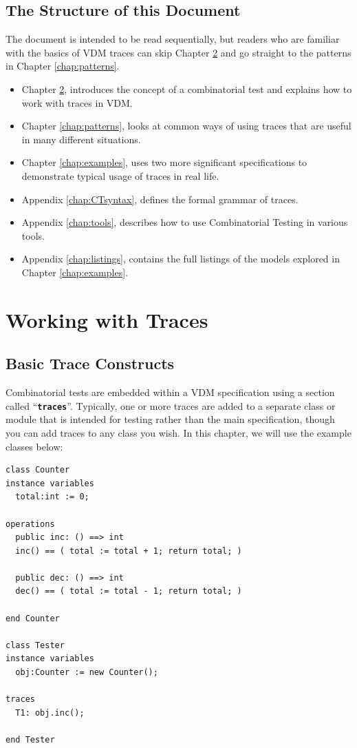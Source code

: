 \documentclass{overturerepchap}
\begin{document}
\section{The Structure of this Document}

The document is intended to be read sequentially, but readers who are familiar
with the basics of VDM traces can skip Chapter \ref{chap:traces} and go straight
to the patterns in Chapter \ref{chap:patterns}.

\begin{itemize}
\item Chapter \ref{chap:traces},  introduces the concept of
a combinatorial test and explains how to work with traces in VDM.
\item Chapter \ref{chap:patterns},  looks at common ways
of using traces that are useful in many different situations.
\item Chapter \ref{chap:examples},  uses two more
significant specifications to demonstrate typical usage of traces in real life.
\item Appendix \ref{chap:CTsyntax},  defines the formal
grammar of traces.
\item Appendix \ref{chap:tools},  describes how to use
Combinatorial Testing in various tools.
\item Appendix \ref{chap:listings},  contains the full
listings of the models explored in Chapter \ref{chap:examples}.
\end{itemize}

\chapter{Working with Traces}
\label{chap:traces}

\section{Basic Trace Constructs}
Combinatorial tests are embedded within a VDM specification using a section
called ``\texttt{\textbf{traces}}''. Typically, one or more traces are added to a separate class
or module that is intended for testing rather than the main specification,
though you can add traces to any class you wish. In this chapter, we will use
the example classes below:

\small
\begin{lstlisting}
class Counter
instance variables
  total:int := 0;

operations
  public inc: () ==> int
  inc() == ( total := total + 1; return total; )

  public dec: () ==> int
  dec() == ( total := total - 1; return total; )

end Counter

class Tester
instance variables
  obj:Counter := new Counter();

traces
  T1: obj.inc();

end Tester
\end{lstlisting}
\normalsize
\end{document}
